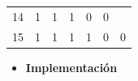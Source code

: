 \begin{center}
\begin{tabular}{ccccccc}
\multicolumn{1}{c|}{14}                          & 1                         & 1                         & 1                         & \multicolumn{1}{c|}{0}                         & \multicolumn{1}{c|}{0}                             &                                  \\
\multicolumn{1}{c|}{15}                          & 1                         & 1                         & 1                         & \multicolumn{1}{c|}{1}                         & \multicolumn{1}{c|}{0}                             & \multirow{-2}{*}{0}             
\end{tabular}
\end{center}
\begin{itemize}[nosep]\item\textbf{Implementación}\end{itemize}
\newpage
